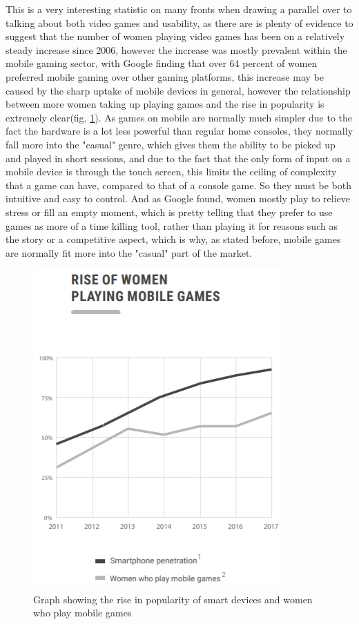 \documentclass[journal]{IEEEtran}
\begin{document}
This is a very interesting statistic on many fronts when drawing a parallel over to talking about both video games and usability, as there are is plenty of evidence to suggest that the number of women playing video games has been on a relatively steady increase since 2006\cite{genderdistribution2006}, however the increase was mostly prevalent within the mobile gaming sector\cite{gameanalyticswomen}, with Google finding that over 64 percent of women preferred mobile gaming over other gaming platforms\cite{womenmobilegaming}, this increase may be caused by the sharp uptake of mobile devices in general, however the relationship between more women taking up playing games and the rise in popularity is extremely clear(fig. \ref{fig:smartphone}). As games on mobile are normally much simpler due to the fact the hardware is a lot less powerful than regular home consoles, they normally fall more into the "casual" genre, which gives them the ability to be picked up and played in short sessions, and due to the fact that the only form of input on a mobile device is through the touch screen, this limits the ceiling of complexity that a game can have, compared to that of a console game. So they must be both intuitive and easy to control. And as Google found\cite{womenmobilegaming}, women mostly play to relieve stress or fill an empty moment, which is pretty telling that they prefer to use games as more of a time killing tool, rather than playing it for reasons such as the story or a competitive aspect, which is why, as stated before, mobile games are normally fit more into the "casual" part of the market.

\begin{figure}
    \centering
    \includegraphics[width=0.5\linewidth]{smartphone.PNG}
    \caption{Graph showing the rise in popularity of smart devices and women who play mobile games \cite{womenmobilegaming}}
    \label{fig:smartphone}
\end{figure}
\end{document}
